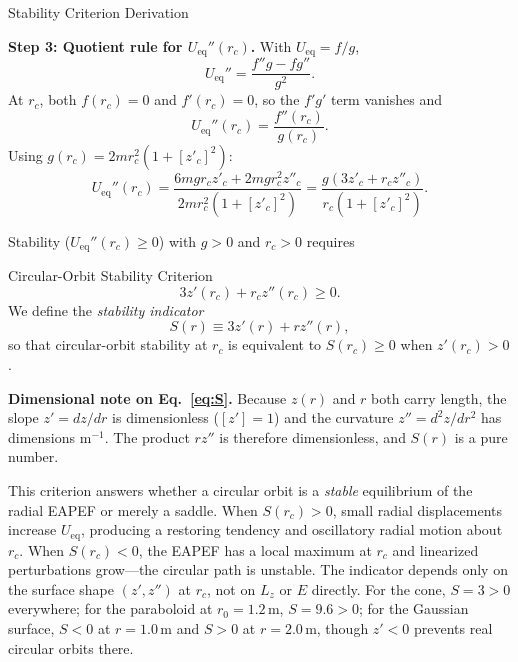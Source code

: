 \documentclass[11pt,letterpaper]{article}
\newcommand{\parhead}[1]{\par\medskip\noindent\textbf{#1}\ignorespaces}
\begin{document}
\begin{derivationbox}{Stability Criterion Derivation}
\parhead{Step 3: Quotient rule for $U_{\mathrm{eq}}''(r_c)$.}
With $U_{\mathrm{eq}}=f/g$,
\begin{equation}
    U_{\mathrm{eq}}'' = \frac{f''g - fg''}{g^2}.
\end{equation}
At $r_c$, both $f(r_c)=0$ and $f'(r_c)=0$, so the $f'g'$ term vanishes and
\begin{equation}
    U_{\mathrm{eq}}''(r_c) = \frac{f''(r_c)}{g(r_c)}.
\end{equation}
Using $g(r_c)=2mr_c^2(1+[z'_c]^2)$:
\begin{equation}
    U_{\mathrm{eq}}''(r_c)
    = \frac{6mg r_c z'_c + 2mg r_c^2 z''_c}
           {2m r_c^2(1+[z'_c]^2)}
    = \frac{g\left(3z'_c + r_c z''_c\right)}
           {r_c(1+[z'_c]^2)}.
\end{equation}
\end{derivationbox}

Stability ($U_{\mathrm{eq}}''(r_c)\ge 0$) with $g>0$ and $r_c>0$ requires
\begin{keyformulabox}{Circular-Orbit Stability Criterion}
\begin{equation}\label{eq:stability}
    3z'(r_c) + r_c z''(r_c) \ge 0.
\end{equation}
We define the \emph{stability indicator}
\begin{equation}\label{eq:S}
    S(r) \equiv 3z'(r) + r z''(r),
\end{equation}
so that circular-orbit stability at $r_c$ is equivalent to $S(r_c)\ge 0$ when $z'(r_c)>0$.
\end{keyformulabox}

\parhead{Dimensional note on Eq.~\eqref{eq:S}.}
Because $z(r)$ and $r$ both carry length, the slope $z'=dz/dr$ is dimensionless ($[z']=1$) and the curvature $z''=d^2z/dr^2$ has dimensions $\mathrm{m^{-1}}$. The product $rz''$ is therefore dimensionless, and $S(r)$ is a pure number.

\begin{summarybox}
This criterion answers whether a circular orbit is a \emph{stable} equilibrium of the radial EAPEF or merely a saddle. When $S(r_c)>0$, small radial displacements increase $U_{\mathrm{eq}}$, producing a restoring tendency and oscillatory radial motion about $r_c$. When $S(r_c)<0$, the EAPEF has a local maximum at $r_c$ and linearized perturbations grow---the circular path is unstable. The indicator depends only on the surface shape $(z',z'')$ at $r_c$, not on $L_z$ or $E$ directly. For the cone, $S=3>0$ everywhere; for the paraboloid at $r_0=1.2\,\mathrm{m}$, $S=9.6>0$; for the Gaussian surface, $S<0$ at $r=1.0\,\mathrm{m}$ and $S>0$ at $r=2.0\,\mathrm{m}$, though $z'<0$ prevents real circular orbits there.
\end{summarybox}
\end{document}
